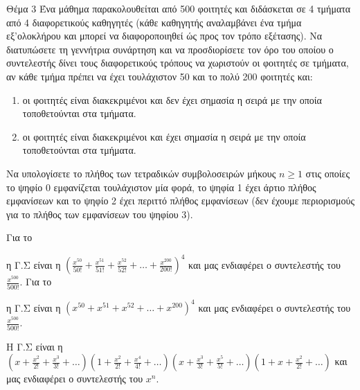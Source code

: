 \documentclass{assignment}
\begin{document}
\begin{problem}{Θέμα 3}
 Ένα μάθημα παρακολουθείται από 500 φοιτητές και διδάσκεται σε 4 τμήματα από 4 διαφορετικούς καθηγητές (κάθε καθηγητής 
αναλαμβάνει ένα τμήμα εξ'ολοκλήρου και μπορεί να διαφοροποιηθεί ώς προς τον τρόπο εξέτασης). Να διατυπώσετε τη γεννήτρια συνάρτηση 
και να προσδιορίσετε τον όρο του οποίου ο συντελεστής δίνει τους διαφορετικούς τρόπους να χωριστούν οι φοιτητές σε τμήματα,
αν κάθε τμήμα πρέπει να έχει τουλάχιστον 50 και το πολύ 200 φοιτητές και:
\begin{enumerate}[1.]
\item οι φοιτητές είναι διακεκριμένοι και δεν έχει σημασία η σειρά με την οποία τοποθετούνται στα τμήματα.
\item οι φοιτητές είναι διακεκριμένοι και έχει σημασία η σειρά με την οποία τοποθετούνται στα τμήματα.
\end{enumerate}
 Να υπολογίσετε το πλήθος των τετραδικών συμβολοσειρών μήκους $n \ge 1$ στις οποίες το ψηφίο 0
εμφανίζεται τουλάχιστον μία φορά, το  ψηφία 1 έχει άρτιο πλήθος εμφανίσεων και το ψηφίο 2 έχει περιττό πλήθος
εμφανίσεων (δεν έχουμε περιορισμούς για το πλήθος των εμφανίσεων του ψηφίου 3).

\solution

\answer
Για το 
\begin{enumerate*}[1] 
\item η Γ.Σ είναι η $(\frac{x^{50}}{50!} + \frac{x^{51}}{51!} + \frac{x^{52}}{52!} + \dots + \frac{x^{200}}{200!})^4$ και μας
ενδιαφέρει ο συντελεστής του $\frac{x^{500}}{500!}$.
Για το
\item η Γ.Σ είναι η $(x^{50} + x^{51} + x^{52} + \dots + x^{200})^4$ και μας ενδιαφέρει ο συντελεστής του $\frac{x^{500}}{500!}$.
\end{enumerate*}

\answer
H Γ.Σ είναι η $(x + \frac{x^2}{2!} + \frac{x^3}{3!} + \dots)(1+\frac{x^2}{2!}+\frac{x^4}{4!}+\dots)
               (x+\frac{x^3}{3!}+\frac{x^5}{5!}+\dots)(1+x+\frac{x^2}{2!}+\dots)$ και μας 
ενδιαφέρει ο συντελεστής του $x^n$.
\end{problem}
\end{document}
